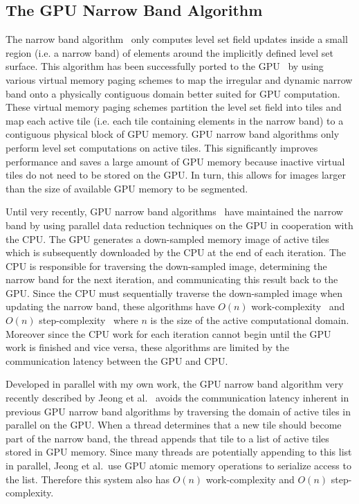 \subsection{The GPU Narrow Band Algorithm}

The narrow band algorithm~\cite{Adalsteinsson-1995} only computes level set field updates inside a small region (i.e. a narrow band) of elements around the implicitly defined level set surface. This algorithm has been successfully ported to the GPU~\cite{Lefohn-2003-MICCAI,Lefohn-2003-Vis,Cates-2004,Lefohn-2004,Jeong-2009} by using various virtual memory paging schemes to map the irregular and dynamic narrow band onto a physically contiguous domain better suited for GPU computation. These virtual memory paging schemes partition the level set field into tiles and map each active tile (i.e. each tile containing elements in the narrow band) to a contiguous physical block of GPU memory. GPU narrow band algorithms only perform level set computations on active tiles. This significantly improves performance and saves a large amount of GPU memory because inactive virtual tiles do not need to be stored on the GPU. In turn, this allows for images larger than the size of available GPU memory to be segmented.

Until very recently, GPU narrow band algorithms~\cite{Lefohn-2003-MICCAI,Lefohn-2003-Vis,Cates-2004,Lefohn-2004} have maintained the narrow band by using parallel data reduction techniques on the GPU in cooperation with the CPU. The GPU generates a down-sampled memory image of active tiles which is subsequently downloaded by the CPU at the end of each iteration. The CPU is responsible for traversing the down-sampled image, determining the narrow band for the next iteration, and communicating this result back to the GPU. Since the CPU must sequentially traverse the down-sampled image when updating the narrow band, these algorithms have $O(n)$ work-complexity~\cite{Atallah-1998} and $O(n)$ step-complexity~\cite{Nyland-2000} where $n$ is the size of the active computational domain. Moreover since the CPU work for each iteration cannot begin until the GPU work is finished and vice versa, these algorithms are limited by the communication latency between the GPU and CPU.

Developed in parallel with my own work, the GPU narrow band algorithm very recently described by Jeong et al.~\cite{Jeong-2009} avoids the communication latency inherent in previous GPU narrow band algorithms by traversing the domain of active tiles in parallel on the GPU. When a thread determines that a new tile should become part of the narrow band, the thread appends that tile to a list of active tiles stored in GPU memory. Since many threads are potentially appending to this list in parallel, Jeong et al.\ use GPU atomic memory operations to serialize access to the list. Therefore this system also has $O(n)$ work-complexity and $O(n)$ step-complexity.

